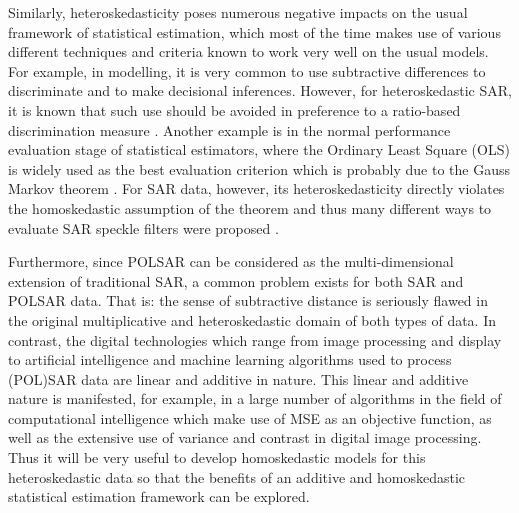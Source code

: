Similarly, heteroskedasticity poses numerous negative impacts on the usual framework of statistical estimation, which most of the time makes use of various different techniques and criteria known to work very well on the usual models.
For example, in modelling, it is very common to use subtractive differences to discriminate and to make decisional inferences. However, for heteroskedastic SAR, it is known that such use should be avoided in preference to a ratio-based discrimination measure \cite{Rignot_1993_TGRS_896}.
Another example is in the normal performance evaluation stage of statistical estimators, where the Ordinary Least Square (OLS) is widely used as the best evaluation criterion which is probably due to the Gauss Markov theorem \cite{Furno_1991_JStatCompSimul}.
For SAR data, however, its heteroskedasticity directly violates the homoskedastic assumption of the theorem and thus many different ways to evaluate SAR speckle filters were proposed \cite{Gagnon_SPIEProc_1997, Argenti_GRSM_2013}.

Furthermore, since POLSAR can be considered as the multi-dimensional extension of
traditional SAR, a common problem exists for both SAR and POLSAR data. That
is: the sense of subtractive distance is seriously flawed in the original multiplicative
and heteroskedastic domain of both types of data. 
In contrast, the digital technologies which range from image processing and display to artificial intelligence and machine learning algorithms used to process (POL)SAR data are linear
and additive in nature. 
This linear and additive nature is manifested, for example, in a
large number of algorithms in the field of computational intelligence which make use of
MSE as an objective function, as well as the extensive use of variance and
contrast in digital image processing. 
Thus it will be very useful to develop homoskedastic models for this heteroskedastic data
  so that the benefits of an additive and homoskedastic statistical estimation framework can be explored.



